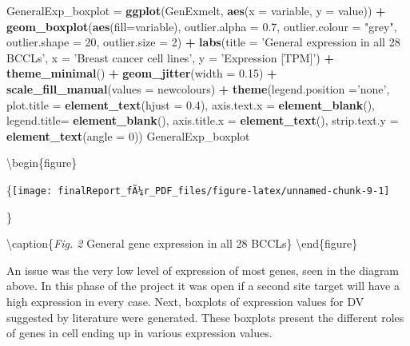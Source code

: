 \documentclass[]{article}
\newenvironment{Shaded}{\begin{snugshade}}{\end{snugshade}}
\newcommand{\DataTypeTok}[1]{\textcolor[rgb]{0.13,0.29,0.53}{#1}}
\newcommand{\DecValTok}[1]{\textcolor[rgb]{0.00,0.00,0.81}{#1}}
\newcommand{\FloatTok}[1]{\textcolor[rgb]{0.00,0.00,0.81}{#1}}
\newcommand{\KeywordTok}[1]{\textcolor[rgb]{0.13,0.29,0.53}{\textbf{#1}}}
\newcommand{\NormalTok}[1]{#1}
\newcommand{\OperatorTok}[1]{\textcolor[rgb]{0.81,0.36,0.00}{\textbf{#1}}}
\newcommand{\StringTok}[1]{\textcolor[rgb]{0.31,0.60,0.02}{#1}}
\begin{document}
\begin{Shaded}
\begin{Highlighting}[]
\NormalTok{GeneralExp_boxplot =}\StringTok{ }\KeywordTok{ggplot}\NormalTok{(GenExmelt, }\KeywordTok{aes}\NormalTok{(}\DataTypeTok{x =}\NormalTok{ variable, }\DataTypeTok{y =}\NormalTok{ value)) }\OperatorTok{+}
\StringTok{     }\KeywordTok{geom_boxplot}\NormalTok{(}\KeywordTok{aes}\NormalTok{(}\DataTypeTok{fill=}\NormalTok{variable), }\DataTypeTok{outlier.alpha =} \FloatTok{0.7}\NormalTok{,}
                \DataTypeTok{outlier.colour =} \StringTok{"grey"}\NormalTok{, }\DataTypeTok{outlier.shape =} \DecValTok{20}\NormalTok{, }\DataTypeTok{outlier.size =} \DecValTok{2}\NormalTok{) }\OperatorTok{+}
\StringTok{     }\KeywordTok{labs}\NormalTok{(}\DataTypeTok{title =} \StringTok{'General expression in all 28 BCCLs'}\NormalTok{, }\DataTypeTok{x =} \StringTok{'Breast cancer cell lines'}\NormalTok{, }\DataTypeTok{y =} \StringTok{'Expression [TPM]'}\NormalTok{) }\OperatorTok{+}
\StringTok{     }\KeywordTok{theme_minimal}\NormalTok{() }\OperatorTok{+}
\StringTok{     }\KeywordTok{geom_jitter}\NormalTok{(}\DataTypeTok{width =} \FloatTok{0.15}\NormalTok{) }\OperatorTok{+}
\StringTok{     }\KeywordTok{scale_fill_manual}\NormalTok{(}\DataTypeTok{values =}\NormalTok{ newcolours) }\OperatorTok{+}
\StringTok{     }\KeywordTok{theme}\NormalTok{(}\DataTypeTok{legend.position =}\StringTok{'none'}\NormalTok{,}
           \DataTypeTok{plot.title =} \KeywordTok{element_text}\NormalTok{(}\DataTypeTok{hjust =} \FloatTok{0.4}\NormalTok{),}
           \DataTypeTok{axis.text.x =} \KeywordTok{element_blank}\NormalTok{(),}
           \DataTypeTok{legend.title=} \KeywordTok{element_blank}\NormalTok{(),}
           \DataTypeTok{axis.title.x =} \KeywordTok{element_text}\NormalTok{(),}
           \DataTypeTok{strip.text.y =} \KeywordTok{element_text}\NormalTok{(}\DataTypeTok{angle =} \DecValTok{0}\NormalTok{))}
\NormalTok{GeneralExp_boxplot}
\end{Highlighting}
\end{Shaded}

\textbackslash begin\{figure\}

\{\centering \texttt{[image: finalReport\_fÃ¼r\_PDF\_files/figure-latex/unnamed-chunk-9-1]}

\}

\textbackslash caption\{\emph{Fig. 2} General gene expression in all 28
BCCLs\}\label{fig:unnamed-chunk-9} \textbackslash end\{figure\}

An issue was the very low level of expression of most genes, seen in the
diagram above. In this phase of the project it was open if a second site
target will have a high expression in every case. Next, boxplots of
expression values for DV suggested by literature were generated. These
boxplots present the different roles of genes in cell ending up in
various expression values.
\end{document}
